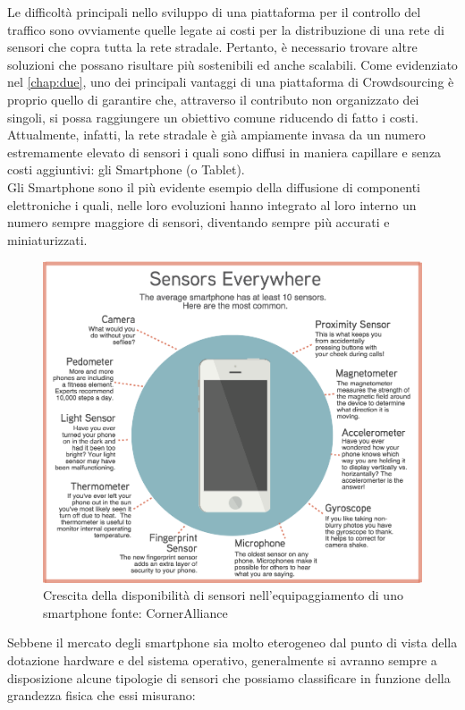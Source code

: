 Le difficoltà principali nello sviluppo di una piattaforma per il controllo del traffico sono ovviamente quelle legate ai costi per la distribuzione di una rete di sensori che copra tutta la rete stradale.
Pertanto, è necessario trovare altre soluzioni che possano risultare più sostenibili ed anche scalabili.
Come evidenziato nel \autoref{chap:due}, uno dei principali vantaggi di una piattaforma di Crowdsourcing è proprio quello di garantire che, attraverso il contributo non organizzato dei singoli, si possa raggiungere un obiettivo comune riducendo di fatto i costi.\\
Attualmente, infatti, la rete stradale è già ampiamente invasa da un numero estremamente elevato di sensori i quali sono diffusi in maniera capillare e senza costi aggiuntivi: gli Smartphone (o Tablet). \\
Gli Smartphone sono il più evidente esempio della diffusione di componenti elettroniche  i quali, nelle loro evoluzioni hanno integrato al loro interno un numero sempre maggiore di sensori, diventando sempre più accurati e miniaturizzati.
\begin{figure}
	\begin{center}
		\includegraphics[width=0.8\columnwidth]{images/smartphone_sensors}
	\end{center}
	\caption{Crescita della disponibilità di sensori nell'equipaggiamento di uno smartphone fonte: CornerAlliance}
	\label{fig:smartphone_sensors}
\end{figure}
Sebbene il mercato degli smartphone sia molto eterogeneo dal punto di vista della dotazione hardware e del sistema operativo, generalmente si avranno sempre a disposizione alcune tipologie di sensori che possiamo classificare in funzione della grandezza fisica che essi misurano:
